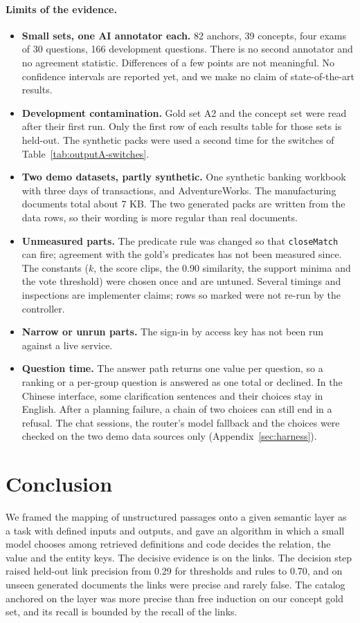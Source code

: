 \documentclass[11pt,a4paper]{article}
\begin{document}
\paragraph{Limits of the evidence.}
\begin{itemize}[nosep]
\item \textbf{Small sets, one AI annotator each.} 82 anchors, 39 concepts, four exams of 30 questions, 166 development questions. There is no second annotator and no agreement statistic. Differences of a few points are not meaningful. No confidence intervals are reported yet, and we make no claim of state-of-the-art results.
\item \textbf{Development contamination.} Gold set A2 and the concept set were read after their first run. Only the first row of each results table for those sets is held-out. The synthetic packs were used a second time for the switches of Table~\ref{tab:outputA-switches}.
\item \textbf{Two demo datasets, partly synthetic.} One synthetic banking workbook with three days of transactions, and AdventureWorks. The manufacturing documents total about 7 KB. The two generated packs are written from the data rows, so their wording is more regular than real documents.
\item \textbf{Unmeasured parts.} The predicate rule was changed so that \texttt{closeMatch} can fire; agreement with the gold's predicates has not been measured since. The constants ($k$, the score clips, the 0.90 similarity, the support minima and the vote threshold) were chosen once and are untuned. Several timings and inspections are implementer claims; rows so marked were not re-run by the controller.
\item \textbf{Narrow or unrun parts.} The sign-in by access key has not been run against a live service. %
\item \textbf{Question time.} The answer path returns one value per question, so a ranking or a per-group question is answered as one total or declined. In the Chinese interface, some clarification sentences and their choices stay in English. After a planning failure, a chain of two choices can still end in a refusal. The chat sessions, the router's model fallback and the choices were checked on the two demo data sources only (Appendix~\ref{sec:harness}). %
\end{itemize}

\section{Conclusion}
We framed the mapping of unstructured passages onto a given semantic layer as a task with defined inputs and outputs, and gave an algorithm in which a small model chooses among retrieved definitions and code decides the relation, the value and the entity keys. The decisive evidence is on the links. The decision step raised held-out link precision from 0.29 for thresholds and rules to 0.70, and on unseen generated documents the links were precise and rarely false. The catalog anchored on the layer was more precise than free induction on our concept gold set, and its recall is bounded by the recall of the links.
\end{document}
